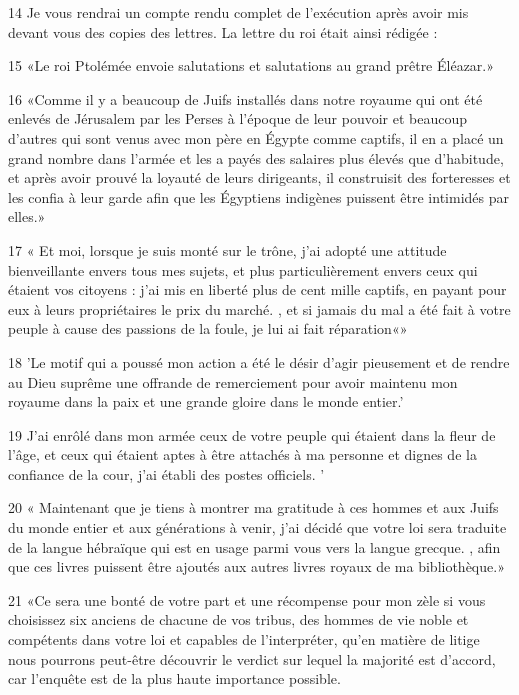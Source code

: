 \par 14 Je vous rendrai un compte rendu complet de l'exécution après avoir mis devant vous des copies des lettres. La lettre du roi était ainsi rédigée :

\par 15 «Le roi Ptolémée envoie salutations et salutations au grand prêtre Éléazar.»

\par 16 «Comme il y a beaucoup de Juifs installés dans notre royaume qui ont été enlevés de Jérusalem par les Perses à l'époque de leur pouvoir et beaucoup d'autres qui sont venus avec mon père en Égypte comme captifs, il en a placé un grand nombre dans l'armée et les a payés des salaires plus élevés que d'habitude, et après avoir prouvé la loyauté de leurs dirigeants, il construisit des forteresses et les confia à leur garde afin que les Égyptiens indigènes puissent être intimidés par elles.»

\par 17 « Et moi, lorsque je suis monté sur le trône, j'ai adopté une attitude bienveillante envers tous mes sujets, et plus particulièrement envers ceux qui étaient vos citoyens : j'ai mis en liberté plus de cent mille captifs, en payant pour eux à leurs propriétaires le prix du marché. , et si jamais du mal a été fait à votre peuple à cause des passions de la foule, je lui ai fait réparation«»

\par 18 'Le motif qui a poussé mon action a été le désir d'agir pieusement et de rendre au Dieu suprême une offrande de remerciement pour avoir maintenu mon royaume dans la paix et une grande gloire dans le monde entier.'

\par 19 J'ai enrôlé dans mon armée ceux de votre peuple qui étaient dans la fleur de l'âge, et ceux qui étaient aptes à être attachés à ma personne et dignes de la confiance de la cour, j'ai établi des postes officiels. '

\par 20 « Maintenant que je tiens à montrer ma gratitude à ces hommes et aux Juifs du monde entier et aux générations à venir, j'ai décidé que votre loi sera traduite de la langue hébraïque qui est en usage parmi vous vers la langue grecque. , afin que ces livres puissent être ajoutés aux autres livres royaux de ma bibliothèque.»

\par 21 «Ce sera une bonté de votre part et une récompense pour mon zèle si vous choisissez six anciens de chacune de vos tribus, des hommes de vie noble et compétents dans votre loi et capables de l'interpréter, qu'en matière de litige nous pourrons peut-être découvrir le verdict sur lequel la majorité est d'accord, car l'enquête est de la plus haute importance possible.

